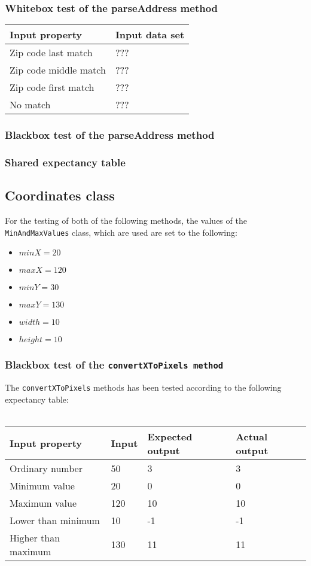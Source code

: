 \documentclass[a4paper,11pt]{article}
\begin{document}
\subsubsection{Whitebox test of the parseAddress method}
\begin{tabular}{ p{7cm} | p{4cm}}
	\textbf{Input property} & \textbf{Input data set} \\
	\hline
	Zip code last match & ??? \\
	Zip code middle match & ??? \\
	Zip code first match & ??? \\
	No match & ???
\end{tabular}

\subsubsection{Blackbox test of the parseAddress method}


\subsubsection{Shared expectancy table}

\pagebreak
\subsection{Coordinates class}
For the testing of both of the following methods, the values of the \texttt{MinAndMaxValues} class, which are used are set to the following:
\begin{itemize}
	\item $minX = 20$
	\item $maxX = 120$
	\item $minY = 30$
	\item $maxY = 130$
	\item $width = 10$
	\item $height = 10$
\end{itemize}

\subsubsection{Blackbox test of the \texttt{convertXToPixels method}}
The \texttt{convertXToPixels} methods has been tested according to the following expectancy table: \\ \\
\begin{tabular}{ p{3.5cm} | p{2.5cm} | p{2.5cm} | p{2.5cm} }
	Input property & Input & Expected output & Actual output \\
	\hline
	Ordinary number & 50 & 3 & 3 \\
	Minimum value & 20 & 0 & 0 \\
	Maximum value & 120 & 10 & 10 \\
	Lower than minimum & 10 & -1 & -1 \\
	Higher than maximum & 130 & 11 & 11
\end{tabular}
\end{document}
